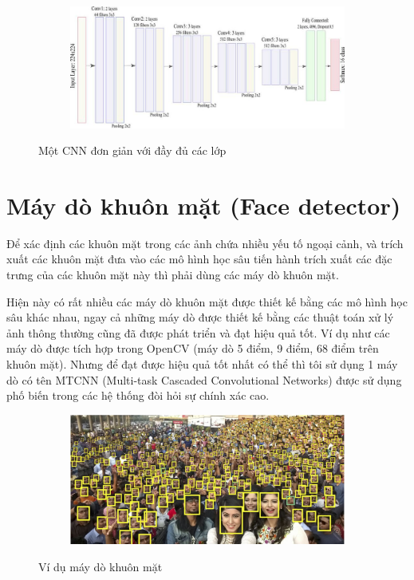 \begin{figure}
    \begin{subfigure}{1.\textwidth}
        \begin{center}
            \includegraphics[width=1.\linewidth]{Chapters/items/chap2_8.jpg}
        \end{center}
        \label{fig:chap2_8}
    \end{subfigure}
    \caption{Một CNN đơn giản với đầy đủ các lớp}
\end{figure}

\newpage
\section{Máy dò khuôn mặt (Face detector)}

Để xác định các khuôn mặt trong các ảnh chứa nhiều yếu tố ngoại cảnh, và trích xuất các khuôn mặt đưa vào các
mô hình học sâu tiến hành trích xuất các đặc trưng của các khuôn mặt này thì phải dùng các máy dò khuôn mặt.

Hiện này có rất nhiều các máy dò khuôn mặt được thiết kế bằng các mô hình học sâu khác nhau, ngay cả những máy dò được
thiết kế bằng các thuật toán xử lý ảnh thông thường cũng đã được phát triển và đạt hiệu quả tốt.
Ví dụ như các máy dò được tích hợp trong OpenCV (máy dò 5 điểm, 9 điểm, 68 điểm trên khuôn mặt). Nhưng để đạt được hiệu quả
tốt nhất có thể thì tôi sử dụng 1 máy dò có tên MTCNN (Multi-task Cascaded Convolutional Networks) được sử dụng phố biến
trong các hệ thống đòi hỏi sự chính xác cao.

\begin{figure}
    \begin{subfigure}{1.\textwidth}
        \begin{center}
            \includegraphics[width=1.\linewidth]{Chapters/items/chap2_test.jpg}
        \end{center}
        \label{fig:chap2_test}
    \end{subfigure}
    \caption{Ví dụ máy dò khuôn mặt}
\end{figure}

